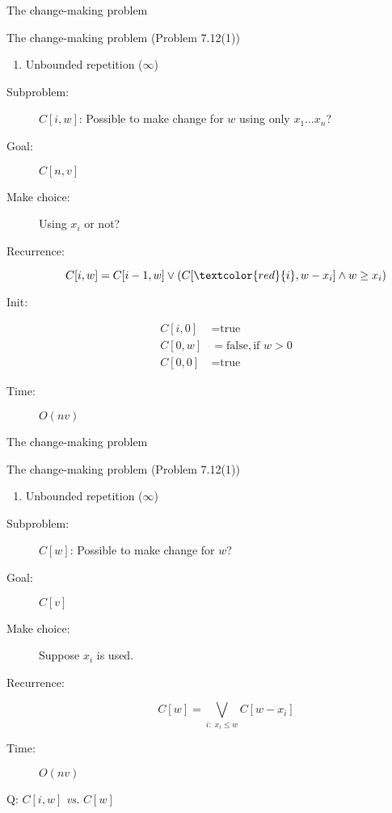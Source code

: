 \begin{frame}{The change-making problem}
  \begin{exampleblock}{The change-making problem (Problem 7.12(1))}
	\begin{enumerate}[(1)]
	  \item Unbounded repetition ($\infty$)
	\end{enumerate}
  \end{exampleblock}

  \pause
  \begin{description}
	\item[Subproblem:] $C[i, w]$: Possible to make change for $w$ using only $x_{1} \dots x_{n}$?
	\item[Goal:] $C[n,v]$
	  \pause
	\item[Make choice:] Using $x_{i}$ or not?
	\item[Recurrence:] 
	  \[
		C[i,w] = C[i-1, w] \lor (C[\textcolor{red}{i}, w-x_{i}] \land w \ge x_{i})
	  \]
	  \pause
	\item[Init:]
	  \begin{align*}
		C[i,0] &= \text{true}  \\
		C[0,w] &= \text{false}, \text{if } w > 0 \\
		C[0,0] &= \text{true}
	  \end{align*}
	\item[Time:] $O(nv)$
  \end{description}
\end{frame}
\begin{frame}{The change-making problem}
  \begin{exampleblock}{The change-making problem (Problem 7.12(1))}
	\begin{enumerate}[(1)]
	  \item Unbounded repetition ($\infty$)
	\end{enumerate}
  \end{exampleblock}

  \pause
  \begin{description}
	\item[Subproblem:] $C[w]$: Possible to make change for $w$?
	\item[Goal:] $C[v]$
	  \pause
	\item[Make choice:] Suppose $x_i$ is used.
	\item[Recurrence:] 
	  \[
		C[w] = \bigvee_{i: \; x_i \le w} C[w-x_i]
	  \]
	  \pause
	\item[Time:] $O(nv)$
  \end{description}

  \pause
  \centerline{Q: $C[i,w]$ \emph{vs.} $C[w]$}
\end{frame}

